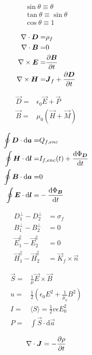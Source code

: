 \begin{align*}
	\sin\theta\equiv\theta\\
	\tan\theta\equiv\sin\theta\\
	\cos\theta\equiv1
\end{align*}

\begin{align*}
    \nabla\cdot\boldsymbol{D} =& \rho_{f} \\
    \nabla\cdot\boldsymbol{B} =& 0 \\
    \nabla \times \boldsymbol{E} =& \frac{\partial \boldsymbol{B}}{\partial t} \\
    \nabla \times \boldsymbol{H} =& \boldsymbol{J}_{f} + \frac{\partial \boldsymbol{D}}{\partial t}
\end{align*}

\begin{align*}
    \vec{D} =& \epsilon_{0}\vec{E} + \vec{P} \\
    \vec{B} =& \mu_{0}(\vec{H} + \vec{M})
\end{align*}

\begin{align*}
    \oint \boldsymbol{D} \cdot \mathrm{d}\boldsymbol{a} =& Q_{f,enc} \\
    \oint \boldsymbol{H} \cdot \mathrm{d}\boldsymbol{l} =& I_{f,enc}(t) + \frac{\mathrm{d} \Phi_{\boldsymbol{D}}}{\mathrm{d} t} \\
    \oint \boldsymbol{B} \cdot \mathrm{d}\boldsymbol{a} =& 0\\
    \oint \boldsymbol{E} \cdot \mathrm{d}\boldsymbol{l} =& - \frac{\mathrm{d} \Phi_{\boldsymbol{B}}}{\mathrm{d} t}
\end{align*}

\begin{align*}
    D_{1}^{\perp} - D_{2}^{\perp} &= \sigma_{f} \\
    B_{1}^{\perp} - B_{2}^{\perp} &= 0 \\
    \vec{E}_{1}^{\parallel} - \vec{E}_{2}^{\parallel} &= 0 \\
    \vec{H}_{1}^{\parallel} - \vec{H}_{2}^{\parallel} &= \vec{K}_f \times \hat{\vec{n}}
\end{align*}

\begin{align*}
    \vec{S} =& \frac{1}{\mu} \vec{E} \times \vec{B} \\
    u =& \frac{1}{2} \left( \epsilon_0 E^{2} + \frac{1}{\mu_0} B^{2} \right) \\
    I =& \langle S \rangle = \frac{1}{2} v\epsilon E_{0}^{2} \\
    P =& \int \vec{S} \cdot \mathrm{d}\vec{a}
\end{align*}

\begin{equation*}
	 \nabla\cdot\boldsymbol{J} = -\frac{\partial \rho}{\partial t}
\end{equation*}

